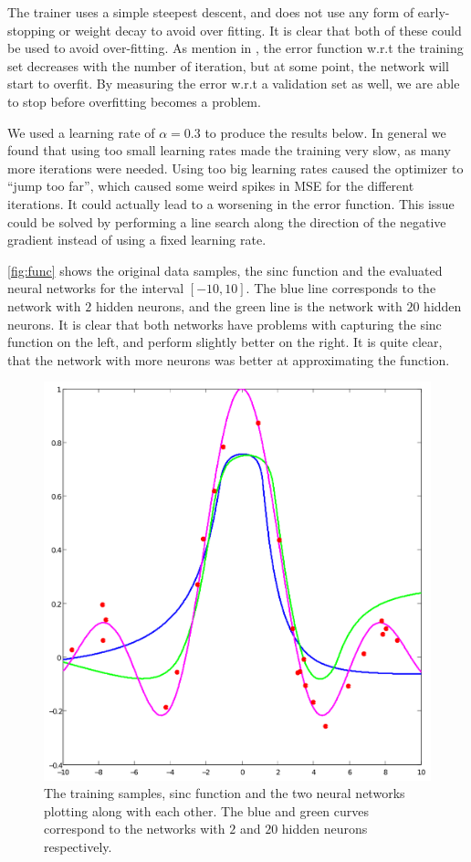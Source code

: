 \documentclass[11pt,a4paper]{article}
\begin{document}
The trainer uses a simple steepest descent, and does not use any form of
early-stopping or weight decay to avoid over fitting. It is clear that both of
these could be used to avoid over-fitting. As mention in \cite{Bishop}, the
error function w.r.t the training set decreases with the number of iteration,
but at some point, the network will start to overfit. By measuring the error
w.r.t a validation set as well, we are able to stop before overfitting becomes
a problem.

We used a learning rate of $\alpha = 0.3$ to produce the results below. In
general we found that using too small learning rates made the training very
slow, as many more iterations were needed. Using too big learning rates
caused the optimizer to ``jump too far'', which caused some weird spikes in
MSE for the different iterations. It could actually lead to a worsening in the
error function. This issue could be solved by performing a line search along
the direction of the negative gradient instead of using a fixed learning rate.

\autoref{fig:func} shows the original data samples, the sinc function and
the evaluated neural networks for the interval $[-10, 10]$. The blue line
corresponds to the network with $2$ hidden neurons, and the green line is the
network with $20$ hidden neurons. It is clear that both networks have problems
with capturing the sinc function on the left, and perform slightly better
on the right. It is quite clear, that the network with more neurons was better
at approximating the function.

\begin{figure}[htbp]
    \centering
    \includegraphics[width=\textwidth]{figures/functions.pdf}
    \caption{The training samples, sinc function and the two neural networks
        plotting along with each other. The blue and green curves correspond
    to the networks with $2$ and $20$ hidden neurons respectively.}
    \label{fig:func}
\end{figure}
\end{document}
